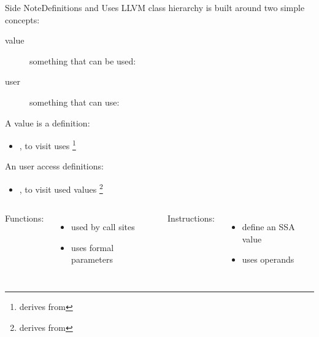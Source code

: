 \documentclass[10pt,mathserif]{beamer}
\begin{document}
\begin{frame}{Side Note}{Definitions and Uses}
LLVM class hierarchy is built around two simple concepts:

\begin{description}
\item[value] something that can be used: 
\item[user] something that can use: 
\end{description}

A value is a \alert{definition}:

\begin{itemize}
\item {},
       to visit uses
      \footnote{ derives from }
\end{itemize}

An user access \alert{definitions}:

\begin{itemize}
\item {},
       to visit used values
      \footnote{ derives from }
\end{itemize}

\vfill
\begin{columns}[t]
Functions:

\begin{itemize}
\item used by call sites
\item uses formal parameters
\end{itemize}

Instructions:

\begin{itemize}
\item define an SSA value
\item uses operands
\end{itemize}
\end{columns}
\end{frame}
\end{document}
